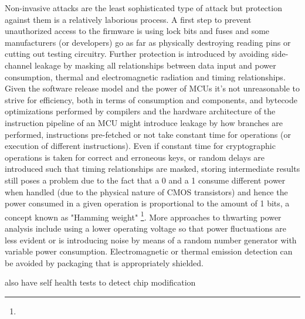 Non-invasive attacks are the least sophisticated type of attack but protection against them is a relatively laborious process\citep{anderson:cautionary_note}. A first step to prevent unauthorized access to the firmware is using lock bits and fuses\citep{atmega_manual}\citep{tech:avrfreaks} and some manufacturers (or developers) go as far as physically destroying reading pins or cutting out testing circuitry\citep{sergei:thesis}. Further protection is introduced by avoiding side-channel leakage by masking all relationships between data input and power consumption, thermal and electromagnetic radiation and timing relationships\citep{kocher:DPA}\cite{sergei:thesis}. Given the software release model and the power of MCUs it's not unreasonable to strive for efficiency, both in terms of consumption and components, and bytecode optimizations performed by compilers and the hardware architecture of the instruction pipeline of an MCU might introduce leakage \citep{kocher:DPA}\citep{sergei:thesis} by how branches are performed, instructions pre-fetched or not take constant time for operations (or execution of different instructions). Even if constant time for cryptographic operations is taken for correct and erroneous keys, or random delays are introduced such that timing relationships are masked, storing intermediate results still poses a problem due to the fact that a 0 and a 1 consume different power when handled (due to the physical nature of CMOS transistors) and hence the power consumed in a given operation is proportional to the amount of 1 bits, a concept known as "Hamming weight" \citep{website:riscure}\citep{kocher:DPA}\footnote{}. More approaches to thwarting power analysis include using a lower operating voltage so that power fluctuations are less evident or is introducing noise by means of a random number generator with variable power consumption\citep{kocher:DPA}\citep{hwre}\citep{kocher:DPA}. Electromagnetic or thermal emission detection can be avoided by packaging that is appropriately shielded\citep{website:ibm_secure}\citep{kocher:DPA}. 


also have self health tests to detect chip modification \citep{anderson:tamper_resistance}

